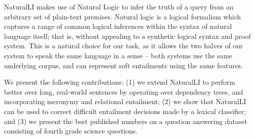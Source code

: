 NaturalLI makes use of Natural Logic \cite{key:1986benthem-natlog,key:1991valencia-natlog}
  to infer the truth of a query from an arbitrary set of plain-text premises.
Natural logic is a logical formalism which captures a range of common logical
  inferences within the syntax of natural language itself;
  that is, without appealing to a synthetic logical syntax and proof system.
This is a natural choice for our task, as it allows the two halves of our system
  to speak the same language in a sense -- both systems use the same underlying
  corpus, and can represent soft entailments using the same features.

We present the following contributions:
(1) we extend NaturalLI to perform better over long, real-world sentences by
  operating over dependency trees, and incorporating meronymy and relational
  entailment;
(2) we show that NaturalLI can be used to correct difficult entailment decisions
  made by a lexical classifier; and
(3) we present the best published numbers on a question answering dataset
  consisting of fourth grade science questions.


